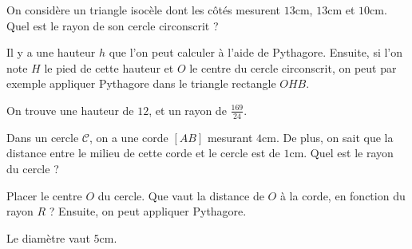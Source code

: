\begin{exo}
On considère un triangle isocèle dont les côtés mesurent $13$cm, $13$cm et $10$cm.
Quel est le rayon de son cercle circonscrit ?
\begin{center}
\end{center}
\begin{hint}
Il y a une hauteur $h$ que l'on peut calculer à l'aide de Pythagore.
Ensuite, si l'on note $H$ le pied de cette hauteur et $O$ le centre du cercle circonscrit, on peut par exemple appliquer Pythagore dans le triangle rectangle $OHB$.
\end{hint}
\begin{sol}
On trouve une hauteur de $12$, et un rayon de $\frac{169}{24}$.
\end{sol}
\end{exo}




\begin{exo}
Dans un cercle $\mathcal C$, on a une corde $[AB]$ mesurant $4$cm. 
De plus, on sait que la distance entre le milieu de cette corde et le cercle est de $1$cm.
Quel est le rayon du cercle ?
\begin{center}
\end{center}
\begin{hint}
Placer le centre $O$ du cercle. Que vaut la distance de $O$ à la corde, en fonction du rayon $R$ ?
Ensuite, on peut appliquer Pythagore.
\end{hint}
\begin{sol}
Le diamètre vaut $5$cm.
\end{sol}
\end{exo}


